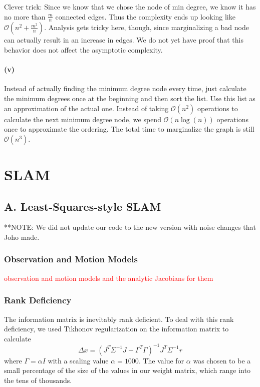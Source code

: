 \documentclass[12pt]{article}
\begin{document}
Clever trick: Since we know that we chose the node of min degree, we know it has
no more than $\frac{m}{n}$ connected edges. Thus the complexity ends up looking
like $\mathcal{O}(n^2 + \frac{m^2}{n})$. Analysis gets tricky here, though,
since marginalizing a bad node can actually result in an increase in edges. We
do not yet have proof that this behavior does not affect the asymptotic
complexity.

\paragraph{(v)}
Instead of actually finding the minimum degree node every time, just calculate
the minimum degrees once at the beginning and then sort the list. Use this list
as an approximation of the actual one. Instead of taking $\mathcal{O}(n^2)$
operations to calculate the next minimum degree node, we spend
$\mathcal{O}(n\log(n))$ operations once to approximate the ordering. The total
time to marginalize the graph is still $\mathcal{O}(n^3)$.

\section{SLAM}

\subsection*{A. Least-Squares-style SLAM}
**NOTE: We did not update our code to the new version with noise changes that Joho made.

\subsubsection*{Observation and Motion Models}
\textcolor{red}{observation and motion models and the analytic Jacobians for them}

\subsubsection*{Rank Deficiency}
The information matrix is inevitably rank deficient.  To deal with this rank deficiency, we used Tikhonov regularization on the information matrix to calculate
$$\Delta x = (J^T \Sigma^{-1}J + \Gamma^T \Gamma)^{-1}J^T \Sigma^{-1} r$$
where $\Gamma = \alpha I$ with a scaling value $\alpha = 1000$.  The value for $\alpha$ was chosen to be a small percentage of the size of the values in our weight matrix, which range into the tens of thousands.
\end{document}
